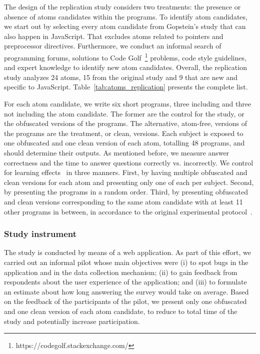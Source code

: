 The design of the replication study considers two treatments: the presence or absence of atoms candidates within the programs. To identify atom candidates, we start out by selecting every atom candidate from Gopstein's study that can also happen in JavaScript. That excludes atoms related to pointers and preprocessor directives. Furthermore, we conduct an informal search of programming forums, solutions to Code Golf~\footnote{https://codegolf.stackexchange.com/} problems, code style guidelines, and expert knowledge to identify new atom candidates. Overall, the replication study analyzes 24 atoms, 15 from the original study and 9 that are new and specific to JavaScript. Table~\ref{tab:atoms_replication} presents the complete list. 

For each atom candidate, we write six short programs, three including and three not including the atom candidate. The former are the control for the study, or the obfuscated versions of the programs. The alternative, atom-free, versions of the programs are the treatment, or clean, versions. Each subject is exposed to one obfuscated and one clean version of each atom, totalling 48 programs, and should determine their outputs. As mentioned before, we measure answer correctness and the time to answer questions correctly vs. incorrectly. We control for learning effects~\cite{Neely:1991:SPE} in three manners. First, by having multiple obfuscated and clean versions for each atom and presenting only one of each per subject. Second, by presenting the programs in a random order. Third, by presenting obfuscated and clean versions corresponding to the same atom candidate with at least 11 other programs in between, in  accordance to the original experimental protocol~\cite{DBLP:conf/sigsoft/GopsteinIYDZYC17}. 

\subsubsection*{Study instrument} 

The study is conducted by means of a web application. As part of this effort, we carried out an informal pilot whose main objectives were (i) to spot bugs in the application and in the data collection mechanism; (ii) to gain feedback from respondents about the user experience of the application; and (iii) to formulate an estimate about how long answering the survey would take on average. Based on the feedback of the participants of the pilot, we present only one obfuscated and one clean version of each atom candidate, to reduce to total time of the study and potentially increase participation.%

